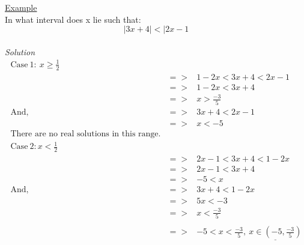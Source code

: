 \documentclass[11pt,a4paper]{article}
\begin{document}
\underline{Example} \\
In what interval does x lie such that: $$|3x+4|<|2x-1$$ \\
\textit{Solution}
\begin{eqnarray*}
  \mathrm{Case\ 1:\ } x \geq \frac{1}{2} && \\
  &=>& 1 - 2x < 3x + 4 < 2x - 1 \\
  &=>& 1 - 2x < 3x + 4 \\
  &=>& x > \frac{-3}{5} \\
  \mathrm{And,} &=>& 3x + 4 < 2x - 1 \\
  &=>& x < -5 \\
  \text{There are no real solutions in this range.} \\
  \mathrm{Case\ 2:} x < \frac{1}{2} && \\
  &=>& 2x - 1 < 3x + 4 < 1 -2x \\
  &=>& 2x - 1 < 3x + 4 \\
  &=>& -5 < x \\
  \mathrm{And,} &=>& 3x + 4 < 1 - 2x \\
  &=>& 5x < -3 \\
  &=>& x < \frac{-3}{5} \\
  \\ &=>&-5 < x < \frac{-3}{5},\ \underline{ x \in \left(-5,\frac{-3}{5}\right) }
\end{eqnarray*}
\end{document}
